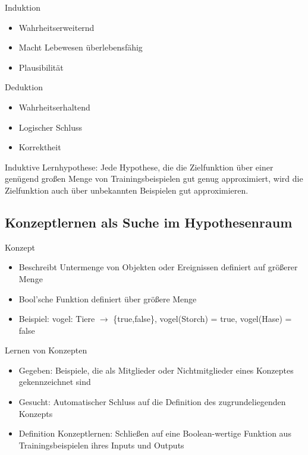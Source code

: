 \documentclass[paper=a4, fontsize=11pt]{scrartcl} %
\numberwithin{equation}{section} %
\numberwithin{figure}{section} %
\numberwithin{table}{section} %
\begin{document}
\begin{minipage}{.5\textwidth}
Induktion
\begin{itemize}
\item Wahrheitserweiternd
\item Macht Lebewesen überlebensfähig
\item Plausibilität
\end{itemize}
\end{minipage}%
\begin{minipage}{.5\textwidth}
Deduktion
\begin{itemize}
\item Wahrheitserhaltend
\item Logischer Schluss
\item Korrektheit
\end{itemize}
\end{minipage}

Induktive Lernhypothese: Jede Hypothese, die die Zielfunktion über einer genügend großen Menge von Trainingsbeispielen gut genug approximiert, wird die Zielfunktion auch über unbekannten Beispielen gut approximieren.

\subsection{Konzeptlernen als Suche im Hypothesenraum}

Konzept
\begin{itemize}
\item Beschreibt Untermenge von Objekten oder Ereignissen definiert auf größerer Menge
\item Bool'sche Funktion definiert über größere Menge
\item Beispiel: vogel: Tiere $\rightarrow$ \{true,false\}, vogel(Storch) = true, vogel(Hase) = false
\end{itemize}

Lernen von Konzepten
\begin{itemize}
\item Gegeben: Beispiele, die als Mitglieder oder Nichtmitglieder eines Konzeptes gekennzeichnet sind
\item Gesucht: Automatischer Schluss auf die Definition des zugrundeliegenden Konzepts
\item Definition Konzeptlernen: Schließen auf eine Boolean-wertige Funktion aus Trainingsbeispielen ihres Inputs und Outputs
\end{itemize}
\end{document}
